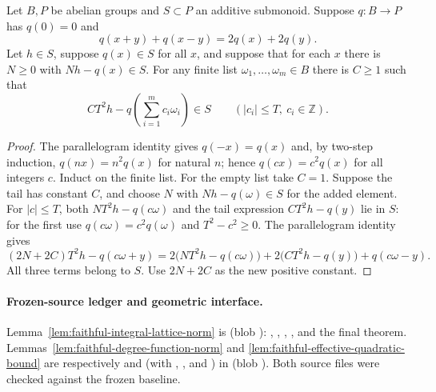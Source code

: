 \begin{srlemma}
\label{lem:faithful-effective-quadratic-bound}
Let \(B,P\) be abelian groups and \(S\subset P\) an additive
submonoid.  Suppose \(q:B\to P\) has \(q(0)=0\) and
\[
                q(x+y)+q(x-y)=2q(x)+2q(y).
\]
Let \(h\in S\), suppose \(q(x)\in S\) for all \(x\), and suppose
that for each \(x\) there is \(N\ge0\) with \(Nh-q(x)\in S\).
For any finite list \(\omega_1,\ldots,\omega_m\in B\) there is
\(C\ge1\) such that
\[
  CT^2h-q\!\left(\sum_{i=1}^m c_i\omega_i\right)\in S
                    \qquad (|c_i|\le T,\ c_i\in\mathbb Z).
 \tag{NN5}\label{eq:faithful-effective-quadratic-bound}
\]
\end{srlemma}
\begin{proof}
The parallelogram identity gives \(q(-x)=q(x)\) and, by
two-step induction, \(q(nx)=n^2q(x)\) for natural \(n\);
hence \(q(cx)=c^2q(x)\) for all integers \(c\).
Induct on the finite list.
For the empty list take \(C=1\).
Suppose the tail has constant \(C\), and choose \(N\) with
\(Nh-q(\omega)\in S\) for the added element.
For \(|c|\le T\), both
\(NT^2h-q(c\omega)\) and the tail expression
\(CT^2h-q(y)\) lie in \(S\): for the first use
\(q(c\omega)=c^2q(\omega)\) and \(T^2-c^2\ge0\).
The parallelogram identity gives
\[
 (2N+2C)T^2h-q(c\omega+y)
  =2\bigl(NT^2h-q(c\omega)\bigr)
   +2\bigl(CT^2h-q(y)\bigr)+q(c\omega-y).
\]
All three terms belong to \(S\).
Use \(2N+2C\) as the new positive constant.
\end{proof}

\paragraph{Frozen-source ledger and geometric interface.}
Lemma~\ref{lem:faithful-integral-lattice-norm} is
\href{https://github.com/ChristianKudeba/alpoge-rh-verification/blob/alpoge-source-7cbf7a0c/src/Development/WeilBound/CoreStatements/TorusUniformisation/ChowMahlerFamilies/KernelRankNormBound.lean}
{}
(blob ):
, ,
, , and the final theorem.
Lemmas~\ref{lem:faithful-degree-function-norm} and
\ref{lem:faithful-effective-quadratic-bound} are respectively
 and  (with
, , and
) in
\href{https://github.com/ChristianKudeba/alpoge-rh-verification/blob/alpoge-source-7cbf7a0c/src/Development/WeilBound/CoreStatements/TorusUniformisation/ChowMahlerFamilies/DegreeMultiplicationNorm.lean}
{}
(blob ).
Both source files were checked against the frozen baseline.

